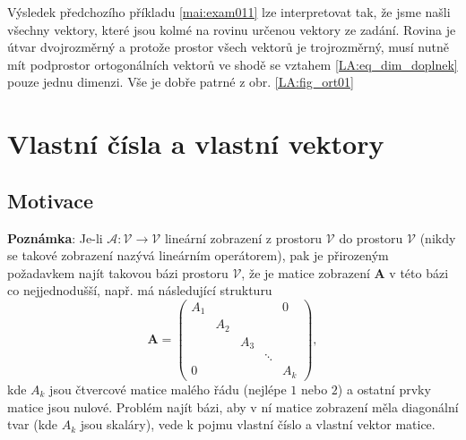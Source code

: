         

      Výsledek předchozího příkladu \ref{mai:exam011} lze interpretovat tak, že jsme našli všechny 
      vektory, které jsou kolmé na rovinu určenou vektory ze zadání. Rovina je útvar       
      dvojrozměrný a protože prostor všech vektorů je trojrozměrný, musí nutně mít podprostor 
      ortogonálních vektorů ve shodě se vztahem \ref{LA:eq_dim_doplnek} pouze jednu dimenzi. Vše 
      je dobře patrné z obr. \ref{LA:fig_ort01}

  \section{Vlastní čísla a vlastní vektory}
    \subsection{Motivace} 
      \textbf{Poznámka}: Je-li \(\mathcal{A} : \mathcal{V} \rightarrow \mathcal{V}\) lineární 
      zobrazení z prostoru \(\mathcal{V}\) do prostoru \(\mathcal{V}\) (nikdy se takové zobrazení 
      nazývá lineárním operátorem), pak je přirozeným požadavkem najít takovou bázi prostoru 
      \(\mathcal{V}\), že je matice zobrazení $\mathbf{A}$ v této bázi co nejjednodušší, např. má 
      následující strukturu
      \begin{equation*}
         \mathbf{A}=
           \left(\begin{array}{ccccc}
             \boxed{A_1}       &             &       &       & 0   \\
                 & \boxed{A_2} &             &       &             \\
                 &             & \boxed{A_3} &       &             \\
                 &             &             &\ddots &             \\
              0  &             &             &       & \boxed{A_k}
            \end{array}
           \right),
     \end{equation*}
     kde \(A_k\) jsou čtvercové matice malého řádu (nejlépe \(1\) nebo \(2\)) a ostatní prvky 
     matice jsou nulové. Problém najít bázi, aby v ní matice zobrazení měla diagonální tvar (kde 
     \(A_k\) jsou skaláry), vede k pojmu vlastní číslo a vlastní vektor matice.

